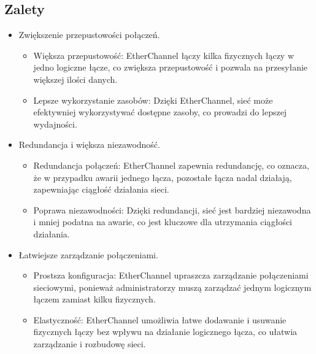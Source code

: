 \subsection{Zalety}
\begin{itemize}
    \item Zwiększenie przepustowości połączeń.
    \begin{itemize}
        \item Większa przepustowość: EtherChannel łączy kilka fizycznych łączy w jedno logiczne łącze, co zwiększa przepustowość i pozwala na przesyłanie większej ilości danych.
        \item Lepsze wykorzystanie zasobów: Dzięki EtherChannel, sieć może efektywniej wykorzystywać dostępne zasoby, co prowadzi do lepszej wydajności.
    \end{itemize}
    \item Redundancja i większa niezawodność.
    \begin{itemize}
        \item Redundancja połączeń: EtherChannel zapewnia redundancję, co oznacza, że w przypadku awarii jednego łącza, pozostałe łącza nadal działają, zapewniając ciągłość działania sieci.
        \item Poprawa niezawodności: Dzięki redundancji, sieć jest bardziej niezawodna i mniej podatna na awarie, co jest kluczowe dla utrzymania ciągłości działania.
    \end{itemize}
    \item Łatwiejsze zarządzanie połączeniami.
    \begin{itemize}
        \item Prostsza konfiguracja: EtherChannel upraszcza zarządzanie połączeniami sieciowymi, ponieważ administratorzy muszą zarządzać jednym logicznym łączem zamiast kilku fizycznych.
        \item Elastyczność: EtherChannel umożliwia łatwe dodawanie i usuwanie fizycznych łączy bez wpływu na działanie logicznego łącza, co ułatwia zarządzanie i rozbudowę sieci.
    \end{itemize}
\end{itemize}

